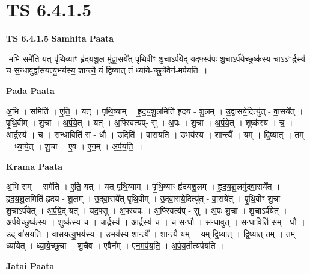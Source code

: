 \documentclass[17pt]{extarticle}
\begin{document}
\section{ TS 6.4.1.5 }

\textbf{TS 6.4.1.5 } \newline
\textbf{Samhita Paata} \newline

-म॒भि समे॑ति॒ यत् पृ॑थि॒व्याꣳ हृ॑दयशू॒ल-मु॑द्वा॒सये᳚त् पृथि॒वीꣳ शु॒चाऽर्प॑ये॒द् यद॒फ्स्व॑पः शु॒चाऽर्प॑ये॒च्छुष्क॑स्य चा॒ऽऽ*र्द्रस्य॑ च स॒न्धावुद्वा॑सयत्यु॒भय॑स्य॒ शान्त्यै॒ यं द्वि॒ष्यात् तं ध्या॑ये-च्छु॒चैवैन॑-मर्पयति ॥ \newline

\textbf{Pada Paata} \newline

अ॒भि । समिति॑ । ए॒ति॒ । यत् । पृ॒थि॒व्याम् । हृ॒द॒य॒शू॒लमिति॑ हृदय - शू॒लम् । उ॒द्वा॒सये॒दित्यु॑त् - वा॒सये᳚त् । पृ॒थि॒वीम् । शु॒चा । अ॒र्प॒ये॒त् । यत् । अ॒फ्स्वित्य॑प्- सु । अ॒पः । शु॒चा । अ॒र्प॒ये॒त् । शुष्क॑स्य । च॒ । आ॒र्द्रस्य॑ । च॒ । स॒न्धाविति॑ सं - धौ । उदिति॑ । वा॒स॒य॒ति॒ । उ॒भय॑स्य । शान्त्यै᳚ । यम् । द्वि॒ष्यात् । तम् । ध्या॒ये॒त् । शु॒चा । ए॒व । ए॒न॒म् । अ॒र्प॒य॒ति॒ ॥  \newline


\textbf{Krama Paata} \newline

अ॒भि सम् । समे॑ति । ए॒ति॒ यत् । यत् पृ॑थि॒व्याम् । पृ॒थि॒व्याꣳ हृ॑दयशू॒लम् । हृ॒द॒य॒शू॒लमु॑द्‌वा॒सये᳚त् । हृ॒द॒य॒शू॒लमिति॑ हृदय - शू॒लम् । उ॒द्‌वा॒सये᳚त् पृथि॒वीम् । उ॒द्‌वा॒सये॒दित्यु॑त् - वा॒सये᳚त् । पृ॒थि॒वीꣳ शु॒चा । शु॒चाऽर्प॑येत् । अ॒र्प॒ये॒द् यत् । यद॒फ्सु । अ॒फ्स्व॑पः । अ॒फ्स्वित्य॑प् - सु । अ॒पः शु॒चा । शु॒चाऽर्प॑येत् । अ॒र्प॒ये॒च्छुष्क॑स्य । शुष्क॑स्य च । चा॒र्द्रस्य॑ । आ॒र्द्रस्य॑ च । च॒ स॒न्धौ । स॒न्धावुत् । स॒न्धाविति॑ सम् - धौ । उद् वा॑सयति । वा॒स॒य॒त्यु॒भय॑स्य । उ॒भय॑स्य॒ शान्त्यै᳚ । शान्त्यै॒ यम् । यम् द्वि॒ष्यात् । द्वि॒ष्यात् तम् । तम् ध्या॑येत् । ध्या॒ये॒च्छु॒चा । शु॒चैव । ए॒वैन᳚म् । ए॒न॒म॒र्प॒य॒ति॒ । अ॒र्प॒य॒तीत्य॑र्पयति । \newline

\textbf{Jatai Paata} \newline
\end{document}
